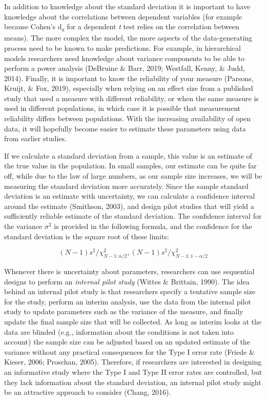 \documentclass[
  english,
  ,jou,floatsintext]{apa6}
\begin{document}
In addition to knowledge about the standard deviation it is important to have knowledge about the correlations between dependent variables (for example because Cohen's d\textsubscript{z} for a dependent \emph{t} test relies on the correlation between means). The more complex the model, the more aspects of the data-generating process need to be known to make predictions. For example, in hierarchical models researchers need knowledge about variance components to be able to perform a power analysis (DeBruine \& Barr, 2019; Westfall, Kenny, \& Judd, 2014). Finally, it is important to know the reliability of your measure (Parsons, Kruijt, \& Fox, 2019), especially when relying on an effect size from a published study that used a measure with different reliability, or when the same measure is used in different populations, in which case it is possible that measurement reliability differs between populations. With the increasing availability of open data, it will hopefully become easier to estimate these parameters using data from earlier studies.

If we calculate a standard deviation from a sample, this value is an estimate of the true value in the population. In small samples, our estimate can be quite far off, while due to the law of large numbers, as our sample size increases, we will be measuring the standard deviation more accurately. Since the sample standard deviation is an estimate with uncertainty, we can calculate a confidence interval around the estimate (Smithson, 2003), and design pilot studies that will yield a sufficiently reliable estimate of the standard deviation. The confidence interval for the variance \(\sigma^2\) is provided in the following formula, and the confidence for the standard deviation is the square root of these limits:

\[(N - 1)s^2/\chi^2_{N-1:\alpha/2},(N - 1)s^2/\chi^2_{N-1:1-\alpha/2}\]

Whenever there is uncertainty about parameters, researchers can use sequential designs to perform an \emph{internal pilot study} (Wittes \& Brittain, 1990). The idea behind an internal pilot study is that researchers specify a tentative sample size for the study, perform an interim analysis, use the data from the internal pilot study to update parameters such as the variance of the measure, and finally update the final sample size that will be collected. As long as interim looks at the data are blinded (e.g., information about the conditions is not taken into account) the sample size can be adjusted based on an updated estimate of the variance without any practical consequences for the Type I error rate (Friede \& Kieser, 2006; Proschan, 2005). Therefore, if researchers are interested in designing an informative study where the Type I and Type II error rates are controlled, but they lack information about the standard deviation, an internal pilot study might be an attractive approach to consider (Chang, 2016).
\end{document}
